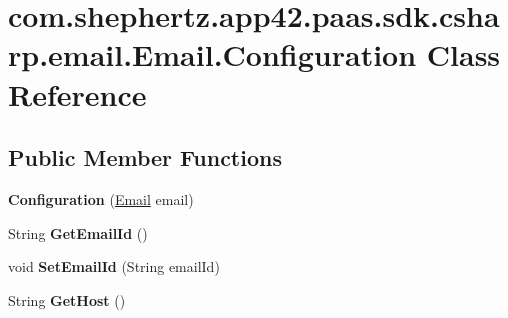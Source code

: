 \hypertarget{classcom_1_1shephertz_1_1app42_1_1paas_1_1sdk_1_1csharp_1_1email_1_1_email_1_1_configuration}{\section{com.\+shephertz.\+app42.\+paas.\+sdk.\+csharp.\+email.\+Email.\+Configuration Class Reference}
\label{classcom_1_1shephertz_1_1app42_1_1paas_1_1sdk_1_1csharp_1_1email_1_1_email_1_1_configuration}
}
\subsection*{Public Member Functions}
\begin{DoxyCompactItemize}
\item 
\hypertarget{classcom_1_1shephertz_1_1app42_1_1paas_1_1sdk_1_1csharp_1_1email_1_1_email_1_1_configuration_abdb029473c9f24096edb148eb732f3fe}{{\bfseries Configuration} (\hyperlink{classcom_1_1shephertz_1_1app42_1_1paas_1_1sdk_1_1csharp_1_1email_1_1_email}{Email} email)}\label{classcom_1_1shephertz_1_1app42_1_1paas_1_1sdk_1_1csharp_1_1email_1_1_email_1_1_configuration_abdb029473c9f24096edb148eb732f3fe}

\item 
\hypertarget{classcom_1_1shephertz_1_1app42_1_1paas_1_1sdk_1_1csharp_1_1email_1_1_email_1_1_configuration_a3a1656dfe764ab2e18f497b7e9e17067}{String {\bfseries Get\+Email\+Id} ()}\label{classcom_1_1shephertz_1_1app42_1_1paas_1_1sdk_1_1csharp_1_1email_1_1_email_1_1_configuration_a3a1656dfe764ab2e18f497b7e9e17067}

\item 
\hypertarget{classcom_1_1shephertz_1_1app42_1_1paas_1_1sdk_1_1csharp_1_1email_1_1_email_1_1_configuration_aee8c6b22c9034197eb333096a8ae303f}{void {\bfseries Set\+Email\+Id} (String email\+Id)}\label{classcom_1_1shephertz_1_1app42_1_1paas_1_1sdk_1_1csharp_1_1email_1_1_email_1_1_configuration_aee8c6b22c9034197eb333096a8ae303f}

\item 
\hypertarget{classcom_1_1shephertz_1_1app42_1_1paas_1_1sdk_1_1csharp_1_1email_1_1_email_1_1_configuration_a4bf2a4bfa3709ca54fd92dd98e140db0}{String {\bfseries Get\+Host} ()}\label{classcom_1_1shephertz_1_1app42_1_1paas_1_1sdk_1_1csharp_1_1email_1_1_email_1_1_configuration_a4bf2a4bfa3709ca54fd92dd98e140db0}


\end{DoxyCompactItemize}
